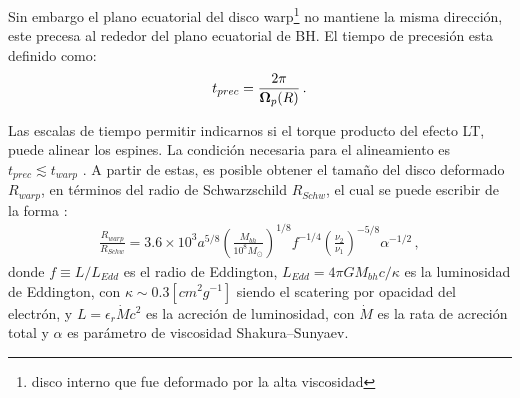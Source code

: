 Sin embargo el plano ecuatorial del disco warp\footnote{disco interno que fue deformado por la alta viscosidad} no mantiene la misma dirección, este precesa al rededor del plano ecuatorial de BH. El tiempo de precesión esta definido como:
%
\begin{align}
    t_{prec}= \frac{2\pi}{{\bf{\Omega}}_p(R)}\,.
\end{align}

Las escalas de tiempo permitir indicarnos si el torque producto del efecto LT, puede alinear los espines. La condición necesaria para el alineamiento es $t_{prec}\lesssim t_{warp}$ \cite{natarajan1999}. A partir de estas, es posible obtener el tamaño del disco deformado $R_{warp}$, en términos del radio de Schwarzschild $R_{Schw}$, el cual se puede escribir de la forma \cite{volonteri2007}:
%
\begin{align}
    \frac{R_{warp}}{R_{Schw}}=3.6\times 10^{3}a^{5/8}\left(\frac{M_{bh}}{10^{8}M_{\odot}} \right)^{1/8}f^{-1/4}\left(\frac{\nu_{2}}{\nu_{1}} \right)^{-5/8}\alpha^{-1/2}\,,
\end{align}
%
donde $f\equiv L/L_{Edd}$ es el radio de Eddington, $L_{Edd}=4\pi GM_{bh}c/\kappa$ es  la luminosidad de Eddington, con $\kappa\sim 0.3 [cm^{2}g^{-1}]$ siendo el scatering por opacidad del electrón, y $L=\epsilon_{r}\dot{M}c^{2}$ es la acreción de luminosidad, con $\dot{M}$ es la rata de acreción total y $\alpha$ es parámetro de viscosidad Shakura–Sunyaev.

